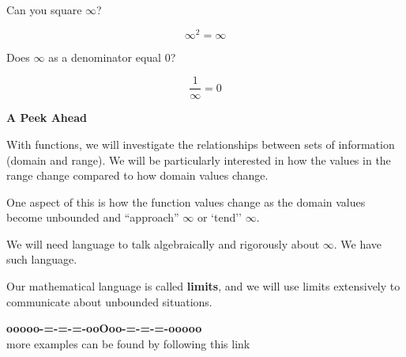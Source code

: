 \documentclass{ximera}
\begin{document}
\begin{question} 


Can you square $\infty$?

\[  \infty^2 = \infty \]


\begin{multipleChoice}
\end{multipleChoice}


\end{question}










\begin{question} 


Does $\infty$ as a denominator equal $0$?

\[  \frac{1}{\infty} = 0 \]


\begin{multipleChoice}
\end{multipleChoice}


\end{question}











\textbf{\textcolor{purple!85!blue}{A Peek Ahead}} 


With functions, we will investigate the relationships between sets of information (domain and range).  We will be particularly interested in how the values in the range change compared to how domain values change. 

One aspect of this is how the function values change as the domain values become unbounded and ``approach'' $\infty$ or `tend'' $\infty$. 

We will need language to talk algebraically and rigorously about $\infty$. We have such language.  


Our mathematical language is called \textbf{\textcolor{purple!85!blue}{limits}}, and we will use limits extensively to communicate about unbounded situations.  











\begin{onlineOnly}
\begin{center}
\textbf{\textcolor{green!50!black}{ooooo-=-=-=-ooOoo-=-=-=-ooooo}} \\

more examples can be found by following this link\\ 

\end{center}
\end{onlineOnly}
\end{document}
